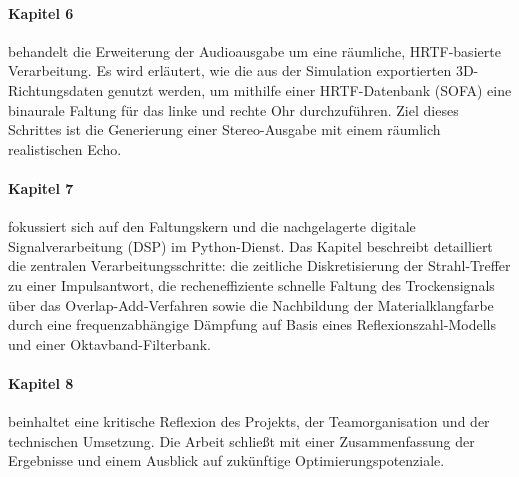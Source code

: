 \paragraph{Kapitel 6} behandelt die Erweiterung der Audioausgabe um eine räumliche,
HRTF-basierte Verarbeitung.
Es wird erläutert, wie die aus der Simulation exportierten 3D-Richtungsdaten genutzt werden, um mithilfe einer HRTF-Datenbank (SOFA)
eine binaurale Faltung für das linke und rechte Ohr durchzuführen.
Ziel dieses Schrittes ist die Generierung einer Stereo-Ausgabe mit einem räumlich realistischen Echo.

\paragraph{Kapitel 7} fokussiert sich auf den Faltungskern und die nachgelagerte digitale Signalverarbeitung (DSP) im Python-Dienst.
Das Kapitel beschreibt detailliert die zentralen Verarbeitungsschritte: die zeitliche Diskretisierung der Strahl-Treffer zu einer Impulsantwort,
die recheneffiziente schnelle Faltung des Trockensignals über das Overlap-Add-Verfahren sowie die
Nachbildung der Materialklangfarbe durch eine frequenzabhängige Dämpfung auf Basis eines Reflexionszahl-Modells und einer Oktavband-Filterbank.

\paragraph{Kapitel 8} beinhaltet eine kritische Reflexion des Projekts, der Teamorganisation und der technischen Umsetzung.
Die Arbeit schließt mit einer Zusammenfassung der Ergebnisse und einem Ausblick auf zukünftige Optimierungspotenziale.